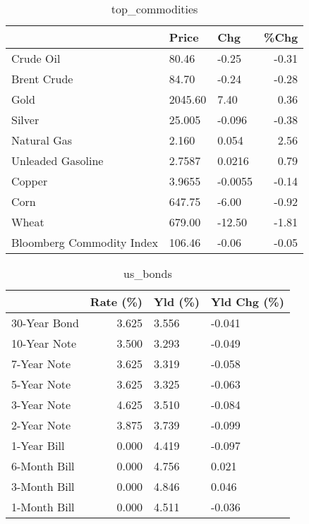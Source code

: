 \documentclass{article}%
\begin{document}
\begin{table}[htbp]%
\caption{top\_commodities}%
\centering%
\begin{adjustbox}{width=1\textwidth}%
\begin{tabular}{lllr}
\toprule
                          &   Price &     Chg &  \%Chg \\
\midrule
               Crude Oil  &   80.46 &   -0.25 & -0.31 \\
             Brent Crude  &   84.70 &   -0.24 & -0.28 \\
                    Gold  & 2045.60 &    7.40 &  0.36 \\
                  Silver  &  25.005 &  -0.096 & -0.38 \\
             Natural Gas  &   2.160 &   0.054 &  2.56 \\
       Unleaded Gasoline  &  2.7587 &  0.0216 &  0.79 \\
                  Copper  &  3.9655 & -0.0055 & -0.14 \\
                    Corn  &  647.75 &   -6.00 & -0.92 \\
                   Wheat  &  679.00 &  -12.50 & -1.81 \\
Bloomberg Commodity Index &  106.46 &   -0.06 & -0.05 \\
\bottomrule
\end{tabular}
%
\end{adjustbox}%
\end{table}

%


\begin{table}[htbp]%
\caption{us\_bonds}%
\centering%
\begin{adjustbox}{width=1\textwidth}%
\begin{tabular}{lrll}
\toprule
             &  Rate (\%) & Yld (\%) & Yld Chg (\%) \\
\midrule
30-Year Bond &     3.625 &   3.556 &      -0.041 \\
10-Year Note &     3.500 &   3.293 &      -0.049 \\
 7-Year Note &     3.625 &   3.319 &      -0.058 \\
 5-Year Note &     3.625 &   3.325 &      -0.063 \\
 3-Year Note &     4.625 &   3.510 &      -0.084 \\
 2-Year Note &     3.875 &   3.739 &      -0.099 \\
 1-Year Bill &     0.000 &   4.419 &      -0.097 \\
6-Month Bill &     0.000 &   4.756 &       0.021 \\
3-Month Bill &     0.000 &   4.846 &       0.046 \\
1-Month Bill &     0.000 &   4.511 &      -0.036 \\
\bottomrule
\end{tabular}
%
\end{adjustbox}%
\end{table}
\end{document}
